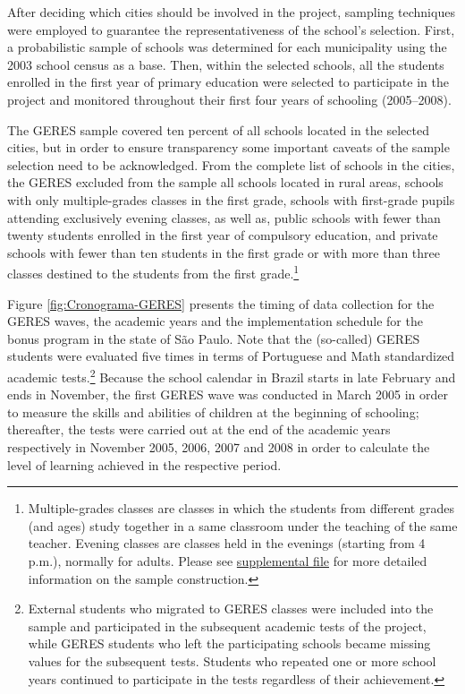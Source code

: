 \documentclass[a4paper, 12pt]{article}
\begin{document}
After deciding which cities should be involved in the project, sampling techniques were employed to guarantee the representativeness of the school’s selection. First, a probabilistic sample of schools was determined for each municipality using the 2003 school census as a base. Then, within the selected schools, all the students enrolled in the first year of primary education were selected to participate in the project and monitored throughout their first four years of schooling (2005–2008).


The GERES sample covered ten percent of all schools located in the selected cities, but \textemdash in order to ensure transparency \textemdash some important caveats of the sample selection need to be acknowledged. From the complete list of schools in the cities, the GERES excluded from the sample all schools located in rural areas, schools with only multiple-grades classes in the first grade, schools with first-grade pupils attending exclusively evening classes, as well as, public schools with fewer than twenty students enrolled in the first year of compulsory education, and private schools with fewer than ten students in the first grade or with more than three classes destined to the students from the first grade.\footnote{Multiple-grades classes are classes in which the students from different grades (and ages) study together in a same classroom under the teaching of the same teacher. Evening classes are classes held in the evenings (starting from 4 p.m.), normally for adults. Please see \hyperref[SuppMaterial]{supplemental file} for more detailed information on the sample construction.}


Figure \ref{fig:Cronograma-GERES} presents the timing of data collection for the GERES waves, the academic years and the implementation schedule for the bonus program in the state of São Paulo. Note that the (so-called) GERES students were evaluated five times in terms of Portuguese and Math standardized academic tests.\footnote{External students who migrated to GERES classes were included into the sample and participated in the subsequent academic tests of the project, while GERES students who left the participating schools became missing values for the subsequent tests. Students who repeated one or more school years continued to participate in the tests regardless of their achievement.} Because the school calendar in Brazil starts in late February and ends in November, the first GERES wave was conducted in March 2005 in order to measure the skills and abilities of children at the beginning of schooling; thereafter, the tests were carried out at the end of the academic years \textemdash respectively in November 2005, 2006, 2007 and 2008 \textemdash in order to calculate the level of learning achieved in the respective period.
\end{document}
